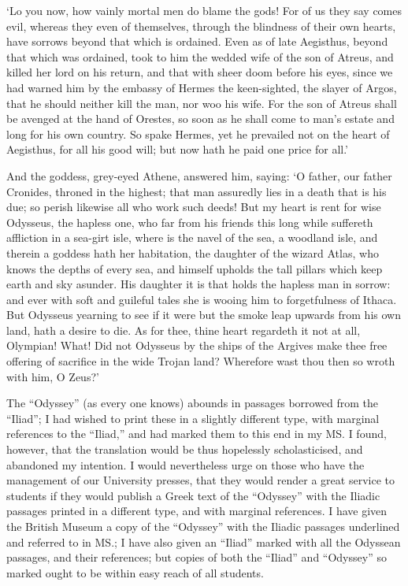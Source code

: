 ‘Lo you now, how vainly mortal men do blame the gods! For of us they say
comes evil, whereas they even of themselves, through the blindness of their own
hearts, have sorrows beyond that which is ordained. Even as of late Aegisthus,
beyond that which was ordained, took to him the wedded wife of the son of
Atreus, and killed her lord on his return, and that with sheer doom before his
eyes, since we had warned him by the embassy of Hermes the keen-sighted, the
slayer of Argos, that he should neither kill the man, nor woo his wife. For the
son of Atreus shall be avenged at the hand of Orestes, so soon as he shall come
to man’s estate and long for his own country. So spake Hermes, yet he prevailed
not on the heart of Aegisthus, for all his good will; but now hath he paid one
price for all.’

And the goddess, grey-eyed Athene, answered him, saying: ‘O father, our
father Cronides, throned in the highest; that man assuredly lies in a death
that is his due; so perish likewise all who work such deeds! But my heart is
rent for wise Odysseus, the hapless one, who far from his friends this long
while suffereth affliction in a sea-girt isle, where is the navel of the sea, a
woodland isle, and therein a goddess hath her habitation, the daughter of the
wizard Atlas, who knows the depths of every sea, and himself upholds the tall
pillars which keep earth and sky asunder. His daughter it is that holds the
hapless man in sorrow: and ever with soft and guileful tales she is wooing him
to forgetfulness of Ithaca. But Odysseus yearning to see if it were but the
smoke leap upwards from his own land, hath a desire to die. As for thee, thine
heart regardeth it not at all, Olympian! What! Did not Odysseus by the ships of
the Argives make thee free offering of sacrifice in the wide Trojan land?
Wherefore wast thou then so wroth with him, O Zeus?’

The “Odyssey” (as every one knows) abounds in passages borrowed from the
“Iliad”; I had wished to print these in a slightly different type, with
marginal references to the “Iliad,” and had marked them to this end in my MS. I
found, however, that the translation would be thus hopelessly scholasticised,
and abandoned my intention. I would nevertheless urge on those who have the
management of our University presses, that they would render a great service to
students if they would publish a Greek text of the “Odyssey” with the Iliadic
passages printed in a different type, and with marginal references. I have
given the British Museum a copy of the “Odyssey” with the Iliadic passages
underlined and referred to in MS.; I have also given an “Iliad” marked with all
the Odyssean passages, and their references; but copies of both the “Iliad” and
“Odyssey” so marked ought to be within easy reach of all students.

